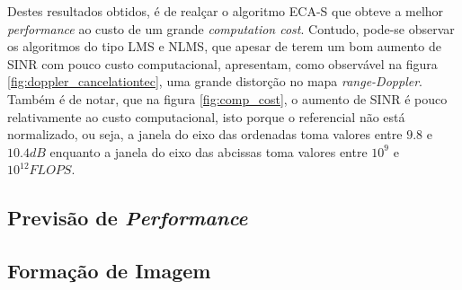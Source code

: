 Destes resultados obtidos, é de realçar o algoritmo \gls{ECA-S} que obteve a melhor \textit{performance} ao custo de um grande \textit{computation cost}. Contudo, pode-se observar os algoritmos do tipo \gls{LMS} e \gls{NLMS}, que apesar de terem um bom aumento de \gls{SINR} com pouco custo computacional, apresentam, como observável na figura \ref{fig:doppler_cancelationtec}, uma grande distorção no mapa \textit{range-Doppler}. Também é de notar, que na figura \ref{fig:comp_cost}, o aumento de \gls{SINR} é pouco relativamente ao custo computacional, isto porque o referencial não está normalizado, ou seja, a janela do eixo das ordenadas toma valores entre $9.8$ e $10.4 dB$ enquanto a janela do eixo das abcissas toma valores entre $10^{9}$ e $10^{12} FLOPS$.

\subsection{Previsão de \textit{Performance}}



\subsection{Formação de Imagem}

